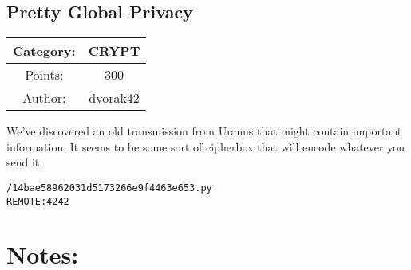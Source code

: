 \begin{center}
\section*{Pretty Global Privacy}
{\large
\begin{tabular}{| c c |}
\hline
Category: & CRYPT\\\hline
Points: & 300\\\hline
Author: & dvorak42\\\hline
\end{tabular}
}
\end{center}
\vspace{0.5in}

{\large
We've discovered an old transmission from Uranus that might contain important information. It seems to be some sort of cipherbox that will encode whatever you send it.
}
\vspace{0.25in}
\begin{center}
  {\Large\tt /14bae58962031d5173266e9f4463e653.py}\\
  {\Large\tt REMOTE:4242}
\end{center}

\vspace{0.25in}
\section*{Notes:}

